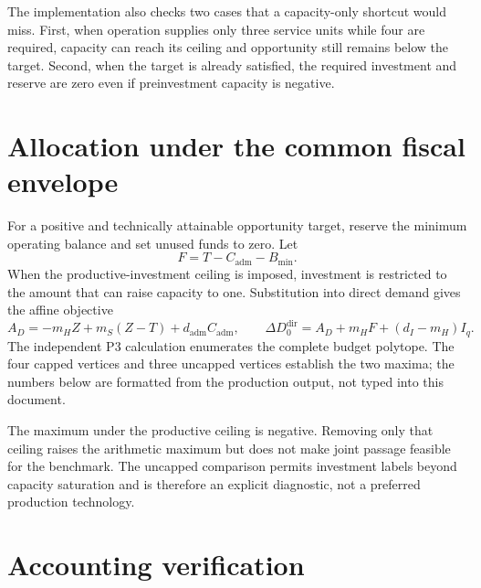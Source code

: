 \documentclass[11pt]{article}
\newcommand{\DD}{\Delta D_0^{\mathrm{dir}}}
\begin{document}
\begin{table}[H]
\centering
\caption{Opportunity minima and fiscal feasibility}
\label{tab:minima}
\resizebox{\textwidth}{!}{}
\end{table}

The implementation also checks two cases that a capacity-only shortcut would
miss. First, when operation supplies only three service units while four are
required, capacity can reach its ceiling and opportunity still remains below the
target. Second, when the target is already satisfied, the required investment
and reserve are zero even if preinvestment capacity is negative.

\clearpage
\section{Allocation under the common fiscal envelope}

For a positive and technically attainable opportunity target, reserve the
minimum operating balance and set unused funds to zero. Let
\[
F=T-C_{\mathrm{adm}}-B_{\min}.
\]
When the productive-investment ceiling is imposed, investment is restricted to
the amount that can raise capacity to one. Substitution into direct demand gives
the affine objective
\[
 A_D=-m_HZ+m_S(Z-T)+d_{\mathrm{adm}}C_{\mathrm{adm}},
 \qquad
\DD=A_D+m_HF+(d_I-m_H)I_q.
\]
The independent P3 calculation enumerates the complete budget polytope. The
four capped vertices and three uncapped vertices establish the two maxima; the
numbers below are formatted from the production output, not typed into this
document.

\begin{table}[H]
\centering
\caption{Demand maxima subject to financing the opportunity floor}
\resizebox{0.93\textwidth}{!}{}
\end{table}

The maximum under the productive ceiling is negative. Removing only that ceiling
raises the arithmetic maximum but does not make joint passage feasible for the
benchmark. The uncapped comparison permits investment labels beyond capacity
saturation and is therefore an explicit diagnostic, not a preferred production
technology.

\section{Accounting verification}
\end{document}
